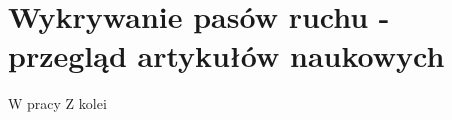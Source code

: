 \section{Wykrywanie pasów ruchu - przegląd artykułów naukowych}

W pracy \cite{}
Z kolei \cite{}







